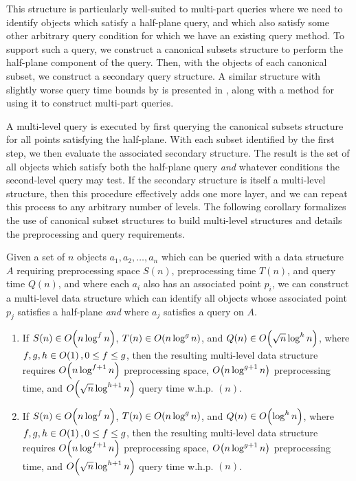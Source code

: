 This structure is particularly well-suited to multi-part queries where we need to identify objects which satisfy a half-plane query, and which also satisfy some other arbitrary query condition for which we have an existing query method.
To support such a query, we construct a canonical subsets structure to perform the half-plane component of the query. 
Then, with the objects of each canonical subset, we construct a secondary query structure.
A similar structure with slightly worse query time bounds by \cite{Matousek92} is presented in \cite{debergch16}, along with a method for using it to construct multi-part queries.

A multi-level query is executed by first querying the canonical subsets structure for all points satisfying the half-plane.
With each subset identified by the first step, we then evaluate the associated secondary structure.
The result is the set of all objects which satisfy both the half-plane query \emph{and} whatever conditions the second-level query may test.
If the secondary structure is itself a multi-level structure, then this procedure effectively adds one more layer, and we can repeat this process to any arbitrary number of levels.
The following corollary formalizes the use of canonical subset structures to build multi-level structures and details the preprocessing and query requirements.


\begin{corollary}
\label{cor:multichan}

Given a set of $n$ objects $a_1, a_2, \ldots, a_n$ which can be queried with a data structure $A$ requiring preprocessing space $S(n)$, preprocessing time $T(n)$, and query time $Q(n)$, and where each $a_i$ also has an associated point $p_i$, we can construct a multi-level data structure which can identify all objects whose associated point $p_j$ satisfies a half-plane  \emph{and} where $a_j$ satisfies a query on $A$.

\begin{enumerate}
\item If $S(n) \in O\!\left(n \log^f{n}\right)$, $T(n) \in O\!\left(n \log^g{n}\right)$, and $Q(n) \in O\!\left(\sqrt{n} \log^h{n}\right)$, where $f, g, h \in O\!\left(1\right), 0 \leq f \leq g$, then the resulting multi-level data structure requires $O\!\left(n\log^{f+1}{n}\right)$ preprocessing space, $O\!\left(n\log^{g+1}{n}\right)$ preprocessing time, and $O\!\left(\sqrt{n}\log^{h+1}{n}\right)$ query time w.h.p. $(n)$.

\item If $S(n) \in O\!\left(n \log^f{n}\right)$, $T(n) \in O\!\left(n \log^g{n}\right)$, and $Q(n) \in O\!\left(\log^h{n}\right)$, where $f, g, h \in O\!\left(1\right), 0 \leq f \leq g$, then the resulting multi-level data structure requires $O\!\left(n\log^{f+1}{n}\right)$ preprocessing space, $O\!\left(n\log^{g+1}{n}\right)$ preprocessing time, and $O\!\left(\sqrt{n}\log^{h+1}{n}\right)$ query time w.h.p. $(n)$.

\end{enumerate}
\end{corollary}


